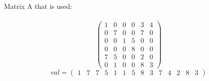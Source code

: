 \documentclass[10pt]{report}
\begin{document}
\\~\\
Matrix A that is used:
\\~\\
$$\left(\begin{array}{cccccc} 1 & 0 & 0 & 0 & 3 & 4\\ 0 & 7 & 0 & 0 & 7 & 0\\ 0 & 0 & 1 & 5 & 0 & 0\\ 0 & 0 & 0 & 8 & 0 & 0\\ 7 & 5 & 0 & 0 & 2 & 0\\ 0 & 1 & 0 & 0 & 8 & 3 \end{array}\right)$$
$$val = \left(\begin{array}{c|c|c|c|c|c|c|c|c|c|c|c|c|c} 1 &7&7&5&1&1&5&8&3&7&4&2&8&3\end{array}\right)$$
\end{document}
